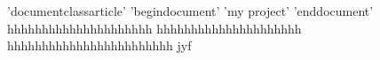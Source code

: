 ’documentclass{article}’
’begin{document}’
’my project’
’end{document}’
hhhhhhhhhhhhhhhhhhhhh
hhhhhhhhhhhhhhhhhhhhh
hhhhhhhhhhhhhhhhhhhhhhhh
jyf
